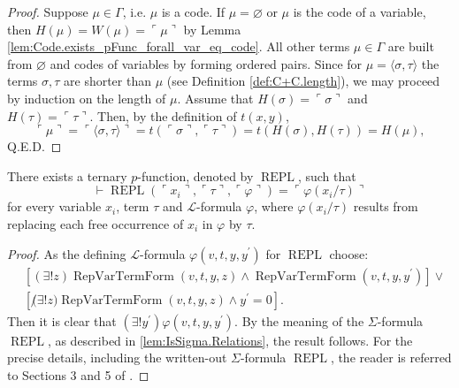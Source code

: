 \begin{proof}
    Suppose $\mu \in \Gamma$, i.e. $\mu$ is a code. 
    If $\mu=\varnothing$ or $\mu$ is the code of a variable,
    then $H(\mu) = W(\mu) = \ulcorner{\mu}\urcorner$ by 
    Lemma \ref{lem:Code.exists_pFunc_forall_var_eq_code}.
    All other terms $\mu \in \Gamma$ are built from $\varnothing$ and codes of variables by
    forming ordered pairs.
    Since for $\mu = \langle \sigma, \tau \rangle$ the terms $\sigma,\tau$ are shorter than $\mu$
    (see Definition \ref{def:C+C.length}), we may proceed by induction on the length of $\mu$.
    Assume that $H(\sigma) = \ulcorner{\sigma}\urcorner$ and $H(\tau) = \ulcorner{\tau}\urcorner$.
    Then, by the definition of $t(x,y)$,
    $$
    \ulcorner{\mu}\urcorner = \ulcorner {\langle \sigma, \tau \rangle} \urcorner =
    t(\ulcorner{\sigma}\urcorner, \ulcorner{\tau}\urcorner) = t(H(\sigma), H(\tau)) = H(\mu),
    $$
    Q.E.D.
\end{proof}

\begin{lemma}
    \label{lem:Code.exists_repl}
    There exists a ternary $p$-function, denoted by $\operatorname{REPL}$, such that
    $$
    \vdash \operatorname{REPL}(\ulcorner{x_i}\urcorner, \ulcorner{\tau}\urcorner, 
    \ulcorner{\varphi}\urcorner) = \ulcorner{\varphi(x_i/\tau)}\urcorner
    $$
    for every variable $x_i$, term $\tau$ and $\mathcal{L}$-formula $\varphi$, where
    $\varphi(x_i/\tau)$ results from replacing each free occurrence of $x_i$ in $\varphi$ by $\tau$.
\end{lemma}

\begin{proof}
    As the defining $\mathcal{L}$-formula $\varphi(v,t,y,y^\prime)$ for $\operatorname{REPL}$ 
    choose:
    \begin{equation*}
        \begin{split}
    & [(\exists!z)\operatorname{RepVarTermForm}(v,t,y,z) \land 
    \operatorname{RepVarTermForm}(v,t,y,y^\prime)] \lor \\
    & [\not (\exists!z)\operatorname{RepVarTermForm}(v,t,y,z) \land y^\prime = 0].
        \end{split}
    \end{equation*}
    Then it is clear that $(\exists!y^\prime)\varphi(v,t,y,y^\prime)$.
    By the meaning of the $\Sigma$-formula $\operatorname{REPL}$, as described in
    \ref{lem:IsSigma.Relations}, the result follows.
    For the precise details, including the written-out $\Sigma$-formula $\operatorname{REPL}$,
    the reader is referred to Sections 3 and 5 of \cite{swierczkowski2003finite}.
\end{proof}


